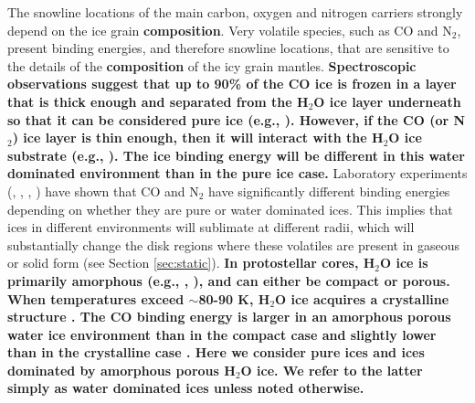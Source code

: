 \documentclass[apj]{emulateapj}
\begin{document}
The snowline locations of the main carbon, oxygen and nitrogen carriers strongly depend on the ice grain \textbf{composition}. Very volatile species, such as CO and N$_2$, present binding energies, and therefore snowline locations, that are sensitive to the details of the \textbf{composition} of the icy grain mantles. 
\textbf{Spectroscopic observations suggest that up to 90\% of the CO ice is frozen in a layer that is thick enough and separated from the H$_2$O ice layer underneath so that it can be considered pure ice (e.g., \citealt{pontoppidan03}). However, if the CO (or N$_2$) ice layer is thin enough, then it will interact with the H$_2$O ice substrate (e.g., \citealt{collings03}). The ice binding energy will be different in this water dominated environment than in the pure ice case.} Laboratory experiments (\citealt{collings03}, \citealt{oberg05}, \citealt{bisschop06}, \citealt{fayolle16}) have shown that CO and N$_2$ have significantly different binding energies depending on whether they are pure or water dominated ices. This implies that ices in different environments will sublimate at different radii, which will substantially change the disk regions where these volatiles are present in gaseous or solid form (see Section \ref{sec:static}).  \textbf{In protostellar cores, H$_2$O ice is primarily amorphous (e.g., \citealt{williams02}, \citealt{vandishoeck14}), and can either be compact or porous.  When temperatures exceed $\sim$80-90 K, H$_2$O ice acquires a crystalline structure \citep{schegerer10}. The CO binding energy is larger in an amorphous porous water ice environment than in the compact case \citep{fayolle16} and slightly lower than in the crystalline case \citep{noble12}. Here we consider pure ices and ices dominated by amorphous porous H$_2$O ice. We refer to the latter simply as water dominated ices unless noted otherwise.} 

 
\end{document}
